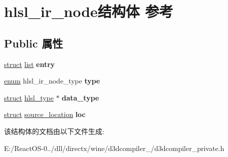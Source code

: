 \hypertarget{structhlsl__ir__node}{}\section{hlsl\+\_\+ir\+\_\+node结构体 参考}
\label{structhlsl__ir__node}
\subsection*{Public 属性}
\begin{DoxyCompactItemize}
\item 
\mbox{\label{structhlsl__ir__node_a39814317f683db148b9e0f9f0fc30fa1}} 
\hyperlink{interfacestruct}{struct} \hyperlink{classlist}{list} {\bfseries entry}
\item 
\mbox{\label{structhlsl__ir__node_a62c80aa9c233836912bf6b872e2bbcae}} 
\hyperlink{interfaceenum}{enum} hlsl\+\_\+ir\+\_\+node\+\_\+type {\bfseries type}
\item 
\mbox{\label{structhlsl__ir__node_af16a01520c18bf23998f22eb1d7516cc}} 
\hyperlink{interfacestruct}{struct} \hyperlink{structhlsl__type}{hlsl\+\_\+type} $\ast$ {\bfseries data\+\_\+type}
\item 
\mbox{\label{structhlsl__ir__node_a00245f7b3b96285e42d72876f56a5e51}} 
\hyperlink{interfacestruct}{struct} \hyperlink{structsource__location}{source\+\_\+location} {\bfseries loc}
\end{DoxyCompactItemize}


该结构体的文档由以下文件生成\+:\begin{DoxyCompactItemize}
\item 
E\+:/\+React\+O\+S-\/0../dll/directx/wine/d3dcompiler\+\_/d3dcompiler\+\_\+private.\+h\end{DoxyCompactItemize}
